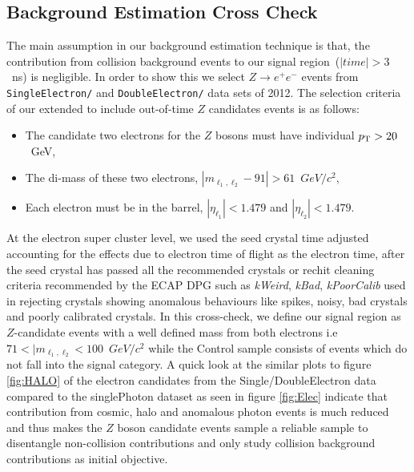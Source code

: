 \subsection{Background Estimation Cross Check}
The main assumption in our background estimation technique is that, the contribution from collision background events to our signal region~($|time| > 3$~ns) is negligible.
In order to show this we select $Z\rightarrow e^{+} e^{-}$ events from \texttt{SingleElectron/} and \texttt{DoubleElectron/} data sets of 2012.
The selection criteria of our extended to include out-of-time $Z$ candidates events is as follows:
\begin{itemize}
\item The candidate two electrons for the $Z$ bosons must have individual $p_{\mathrm{T}} > 20$~GeV,
\item The di-mass of these two electrons, $|m_{\ell_{1}, \ell_{2}} - 91| > 61$~$GeV/c^{2}$,
\item Each electron must be in the barrel, $|\eta_{\ell_{1}}| < 1.479$ and $ |\eta_{\ell_{2}}| < 1.479$.
\end{itemize}
 At the electron super cluster level,  we used the seed crystal time adjusted accounting for the effects due to electron time of flight as the electron time, after the seed crystal has passed all the recommended crystals or rechit cleaning criteria recommended by the ECAP DPG such as \textit{kWeird}, \textit{kBad}, \textit{kPoorCalib} used in rejecting crystals showing anomalous behaviours like spikes, noisy, bad crystals and poorly calibrated crystals.
In this cross-check, we define our signal region as $Z$-candidate events with a well defined mass from both electrons i.e  $71 < |m_{\ell_{1}, \ell_{2}} < 100$~$GeV/c^{2}$ while the Control sample consists of events which do not fall into the signal category.
A quick look at the similar plots to figure \ref{fig:HALO} of the electron candidates from the Single/DoubleElectron data compared to the singlePhoton dataset as seen in figure \ref{fig:Elec} indicate that contribution from cosmic, halo and anomalous photon events is much reduced and thus makes the $Z$ boson candidate events sample a reliable sample to disentangle non-collision contributions and only study collision background contributions as initial objective.
